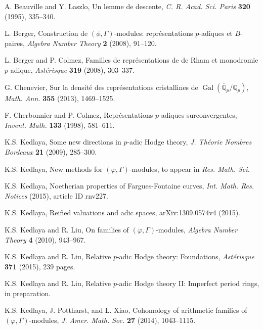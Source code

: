 \documentclass[12pt]{amsart}
\theoremstyle{definition}
\numberwithin{equation}{theorem}
\newcommand{\QQ}{\mathbb{Q}}
\DeclareMathOperator{\Gal}{Gal}
\begin{document}
\begin{thebibliography}{99}

A. Beauville and Y. Laszlo, Un lemme de descente, \textit{C. R. Acad. Sci. Paris} \textbf{320} (1995), 335--340.

L. Berger, Construction de $(\phi, \Gamma)$-modules: repr\'esentations $p$-adiques et $B$-paires, \textit{Algebra Number Theory} \textbf{2} (2008), 91--120.

L. Berger and P. Colmez, Familles de repr\'esentations de de Rham et monodromie $p$-adique, \textit{Ast\'erisque} \textbf{319} (2008), 303--337.

G. Chenevier, Sur la densit\'e des repr\'esentations cristallines de
$\Gal(\overline{\QQ}_p/\QQ_p)$, \textit{Math. Ann.} \textbf{355} (2013), 1469--1525.

F. Cherbonnier and P. Colmez, Repr\'esentations $p$-adiques surconvergentes,
\textit{Invent. Math.} \textbf{133} (1998), 581--611.

K.S. Kedlaya, Some new directions in $p$-adic Hodge theory, \textit{J. Th\'eorie Nombres Bordeaux} \textbf{21} (2009), 285--300.

K.S. Kedlaya, New methods for $(\varphi, \Gamma)$-modules,
to appear in \textit{Res. Math. Sci.}

K.S. Kedlaya, Noetherian properties of Fargues-Fontaine curves,
\textit{Int. Math. Res. Notices} (2015), article ID rnv227. 

K.S. Kedlaya, Reified valuations and adic spaces, arXiv:1309.0574v4 (2015).

K.S. Kedlaya and R. Liu, On families of $(\varphi, \Gamma)$-modules,
\textit{Algebra Number Theory} \textbf{4} (2010), 943--967.

K.S. Kedlaya and R. Liu, Relative $p$-adic Hodge theory: Foundations,
\textit{Ast\'erisque} \textbf{371} (2015), 239 pages. 

K.S. Kedlaya and R. Liu, Relative $p$-adic Hodge theory II: Imperfect period rings,
in preparation.

K.S. Kedlaya, J. Pottharst, and L. Xiao, Cohomology of arithmetic families of $(\varphi, \Gamma)$-modules, \textit{J. Amer. Math. Soc.}  \textbf{27} (2014), 1043--1115. 


\end{thebibliography}
\end{document}
